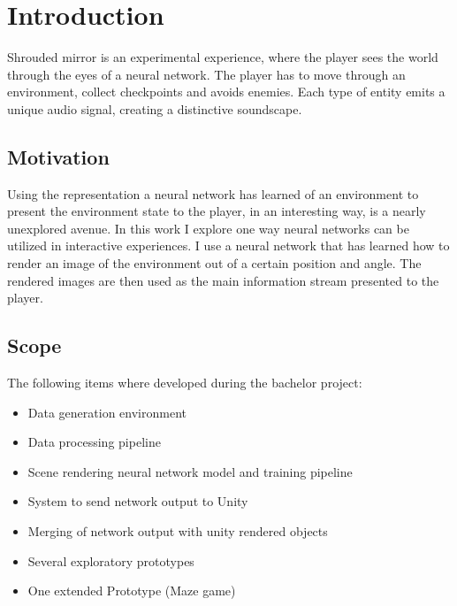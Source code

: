 
\chapter{Introduction}
Shrouded mirror is an experimental experience, where the player sees the world through the eyes of a neural network. The player has to move through an environment, collect checkpoints and avoids enemies. Each type of entity emits a unique audio signal, creating a distinctive soundscape.

\section{Motivation}
Using the representation a neural network has learned of an environment to present the environment state to the player, in an interesting way, is a nearly unexplored avenue. In this work I explore one way neural networks can be utilized in interactive experiences. I use a neural network that has learned how to  render an image of the environment out of a certain position and angle. The rendered images are then used as the main information stream presented to the player.

\newpage
\section{Scope}
The following items where developed during the bachelor project:

\begin{itemize}
\item{Data generation environment}
\item{Data processing pipeline}
\item{Scene rendering neural network model and training pipeline}
\item{System to send network output to Unity}
\item{Merging of network output with unity rendered objects}
\item{Several exploratory prototypes}
\item{One extended Prototype (Maze game)}
\end{itemize}

